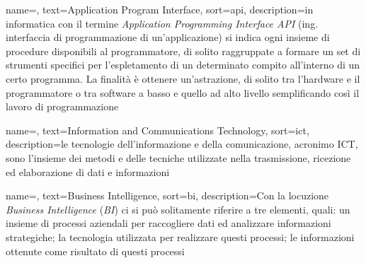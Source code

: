 
\renewcommand{\acronymname}{Acronimi e abbreviazioni}


    
    

\renewcommand{\glossaryname}{Glossario}

{
    name=,
    text=Application Program Interface,
    sort=api,
    description={in informatica con il termine \emph{Application Programming Interface API} (ing. interfaccia di programmazione di un'applicazione) si indica ogni insieme di procedure disponibili al programmatore, di solito raggruppate a formare un set di strumenti specifici per l'espletamento di un determinato compito all'interno di un certo programma. La finalità è ottenere un'astrazione, di solito tra l'hardware e il programmatore o tra software a basso e quello ad alto livello semplificando così il lavoro di programmazione}
}

{
	name=,
	text=Information and Communications Technology,
	sort=ict,
	description={le tecnologie dell'informazione e della comunicazione, acronimo ICT, sono l'insieme dei metodi e delle tecniche utilizzate nella trasmissione, ricezione ed elaborazione di dati e informazioni}
}

{
	name=,
	text=Business Intelligence,
	sort=bi,
	description={Con la locuzione \textit{Business Intelligence} (\textit{BI}) ci si può solitamente riferire a tre elementi, quali: un insieme di processi aziendali per raccogliere dati ed analizzare informazioni strategiche; la tecnologia utilizzata per realizzare questi processi; le informazioni ottenute come risultato di questi processi}
}
